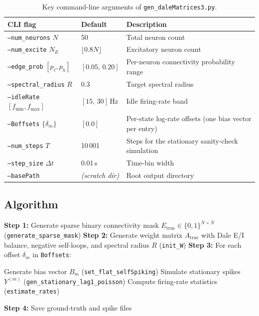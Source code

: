 \documentclass[11pt]{article}
\begin{document}
\begin{table}[h]
\centering
\begin{tabular}{lll}
\toprule
CLI flag & Default & Description \\
\midrule
\texttt{--num\_neurons} $N$ & 50 & Total neuron count \\
\texttt{--num\_excite} $N_E$ & $\lfloor 0.8N \rfloor$ &
  Excitatory neuron count \\
\texttt{--edge\_prob} $[p_\ell, p_h]$ & $[0.05,\, 0.20]$ &
  Per-neuron connectivity probability range \\
\texttt{--spectral\_radius} $R$ & 0.3 &
  Target spectral radius \\
\texttt{--idleRate} $[f_{\min}, f_{\max}]$ & $[15,\, 30]$\,Hz &
  Idle firing-rate band \\
\texttt{--Boffsets} $\{\delta_m\}$ & $[0.0]$ &
  Per-state log-rate offsets (one bias vector per entry) \\
\texttt{--num\_steps} $T$ & 10\,001 &
  Steps for the stationary sanity-check simulation \\
\texttt{--step\_size} $\Delta t$ & 0.01\,s & Time-bin width \\
\texttt{--basePath} & \emph{(scratch dir)} &
  Root output directory \\
\bottomrule
\end{tabular}
\caption{Key command-line arguments of \texttt{gen\_daleMatrices3.py}.}
\label{tab:dale_args}
\end{table}

\subsection{Algorithm}

\begin{algorithm}[H]
\caption{Dale Matrix Generation (\texttt{gen\_daleMatrices3.py})}
\begin{algorithmic}[1]
\STATE \textbf{Step 1:} Generate sparse binary connectivity mask
       $E_{\text{true}} \in \{0,1\}^{N\times N}$
       (\texttt{generate\_sparse\_mask})
\STATE \textbf{Step 2:} Generate weight matrix $A_{\text{true}}$ with
       Dale E/I balance, negative self-loops, and spectral radius $R$
       (\texttt{init\_W})
\STATE \textbf{Step 3:} For each offset $\delta_m$ in \texttt{Boffsets}:
\begin{ALC@g}
  \STATE Generate bias vector $B_m$ (\texttt{set\_flat\_selfSpiking})
  \STATE Simulate stationary spikes $Y^{(m)}$
         (\texttt{gen\_stationary\_lag1\_poisson})
  \STATE Compute firing-rate statistics (\texttt{estimate\_rates})
\end{ALC@g}
\STATE \textbf{Step 4:} Save ground-truth and spike files
\end{algorithmic}
\end{algorithm}
\end{document}
